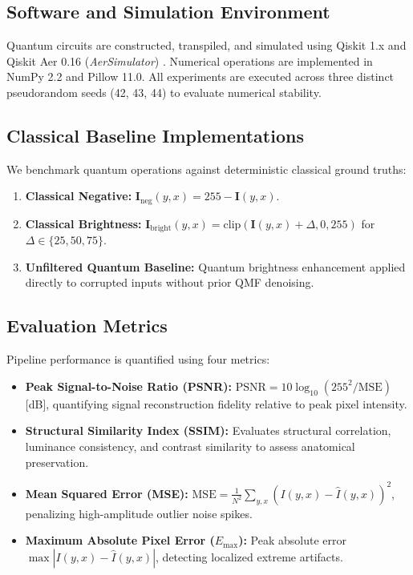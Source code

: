 \documentclass[12pt,onecolumn,draftclsnofoot]{IEEEtran}
\begin{document}
\subsection{Software and Simulation Environment}
Quantum circuits are constructed, transpiled, and simulated using Qiskit 1.x and Qiskit Aer 0.16 (\textsl{AerSimulator}) \cite{qiskit2024}. Numerical operations are implemented in NumPy 2.2 and Pillow 11.0. All experiments are executed across three distinct pseudorandom seeds (42, 43, 44) to evaluate numerical stability.

\subsection{Classical Baseline Implementations}
We benchmark quantum operations against deterministic classical ground truths:
\begin{enumerate}
    \item \textbf{Classical Negative:} $\mathbf{I}_{\text{neg}}(y, x) = 255 - \mathbf{I}(y, x)$.
    \item \textbf{Classical Brightness:} $\mathbf{I}_{\text{bright}}(y, x) = \text{clip}(\mathbf{I}(y, x) + \Delta, 0, 255)$ for $\Delta \in \{25, 50, 75\}$.
    \item \textbf{Unfiltered Quantum Baseline:} Quantum brightness enhancement applied directly to corrupted inputs without prior QMF denoising.
\end{enumerate}

\subsection{Evaluation Metrics}
Pipeline performance is quantified using four metrics:
\begin{itemize}
    \item \textbf{Peak Signal-to-Noise Ratio (PSNR):} $\text{PSNR} = 10 \log_{10}(255^2 / \text{MSE})$ [dB], quantifying signal reconstruction fidelity relative to peak pixel intensity.
    \item \textbf{Structural Similarity Index (SSIM):} Evaluates structural correlation, luminance consistency, and contrast similarity \cite{wang2004image} to assess anatomical preservation.
    \item \textbf{Mean Squared Error (MSE):} $\text{MSE} = \frac{1}{N^2} \sum_{y, x} (I(y, x) - \hat{I}(y, x))^2$, penalizing high-amplitude outlier noise spikes.
    \item \textbf{Maximum Absolute Pixel Error ($E_{\text{max}}$):} Peak absolute error $\max |I(y, x) - \hat{I}(y, x)|$, detecting localized extreme artifacts.
\end{itemize}
\end{document}
